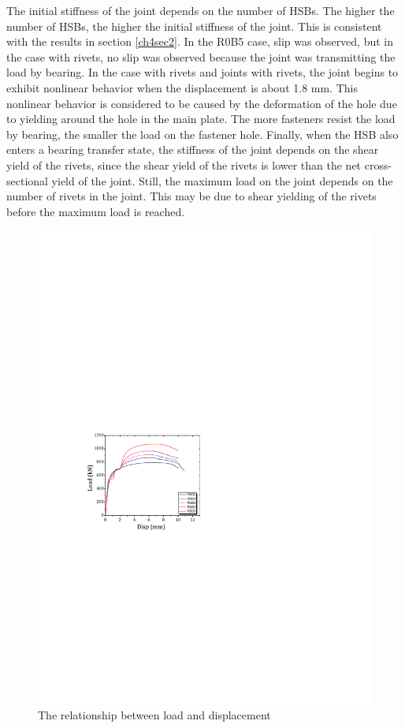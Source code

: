 The initial stiffness of the joint depends on the number of \ac{HSB}s. The higher the number of \ac{HSB}s, the higher the initial stiffness of the joint. This is consistent with the results in section \ref{ch4sec2}. In the R0B5 case, slip was observed, but in the case with rivets, no slip was observed because the joint was transmitting the load by bearing. In the case with rivets and joints with rivets, the joint begins to exhibit nonlinear behavior when the displacement is about 1.8 mm. This nonlinear behavior is considered to be caused by the deformation of the hole due to yielding around the hole in the main plate. The more fasteners resist the load by bearing, the smaller the load on the fastener hole. Finally, when the \ac{HSB} also enters a bearing transfer state, the stiffness of the joint depends on the shear yield of the rivets, since the shear yield of the rivets is lower than the net cross-sectional yield of the joint. Still, the maximum load on the joint depends on the number of rivets in the joint. This may be due to shear yielding of the rivets before the maximum load is reached.

\begin{figure}[htbp]
    \centering
    \includegraphics[width=0.7\linewidth]{imgs//ch4/fig-5rld.pdf}
    \caption{The relationship between load and displacement}
    \label{fig-5rld}
\end{figure}


